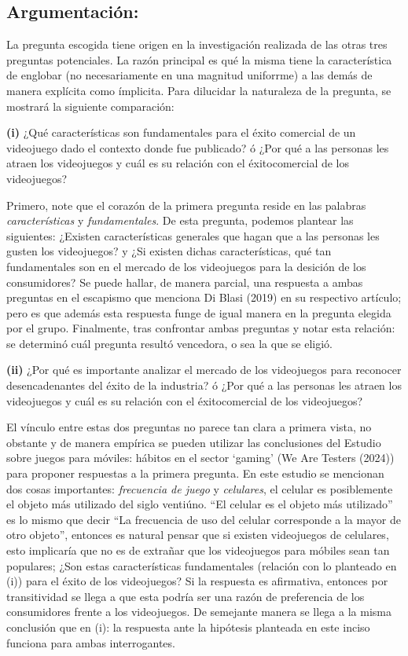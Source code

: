 \documentclass[
  letterpaper,
  DIV=11,
  numbers=noendperiod]{scrreprt}
\begin{document}
\hypertarget{argumentaciuxf3n}{%
\subsection{Argumentación:}\label{argumentaciuxf3n}}

La pregunta escogida tiene origen en la investigación realizada de las
otras tres preguntas potenciales. La razón principal es qué la misma
tiene la característica de englobar (no necesariamente en una magnitud
uniforrme) a las demás de manera explícita como ímplicita. Para
dilucidar la naturaleza de la pregunta, se mostrará la siguiente
comparación:

\textbf{(i)} ¿Qué características son fundamentales para el éxito
comercial de un videojuego dado el contexto donde fue publicado? ó ¿Por
qué a las personas les atraen los videojuegos y cuál es su relación con
el éxitocomercial de los videojuegos?

Primero, note que el corazón de la primera pregunta reside en las
palabras \emph{características} y \emph{fundamentales}. De esta
pregunta, podemos plantear las siguientes: ¿Existen características
generales que hagan que a las personas les gusten los videojuegos? y ¿Si
existen dichas características, qué tan fundamentales son en el mercado
de los videojuegos para la desición de los consumidores? Se puede
hallar, de manera parcial, una respuesta a ambas preguntas en el
escapismo que menciona Di Blasi (2019) en su respectivo artículo; pero
es que además esta respuesta funge de igual manera en la pregunta
elegida por el grupo. Finalmente, tras confrontar ambas preguntas y
notar esta relación: se determinó cuál pregunta resultó vencedora, o sea
la que se eligió.

\textbf{(ii)} ¿Por qué es importante analizar el mercado de los
videojuegos para reconocer desencadenantes del éxito de la industria? ó
¿Por qué a las personas les atraen los videojuegos y cuál es su relación
con el éxitocomercial de los videojuegos?

El vínculo entre estas dos preguntas no parece tan clara a primera
vista, no obstante y de manera empírica se pueden utilizar las
conclusiones del Estudio sobre juegos para móviles: hábitos en el sector
`gaming' (We Are Testers (2024)) para proponer respuestas a la primera
pregunta. En este estudio se mencionan dos cosas importantes:
\emph{frecuencia de juego} y \emph{celulares}, el celular es
posiblemente el objeto más utilizado del siglo ventiúno. ``El celular es
el objeto más utilizado'' es lo mismo que decir ``La frecuencia de uso
del celular corresponde a la mayor de otro objeto'', entonces es natural
pensar que si existen videojuegos de celulares, esto implicaría que no
es de extrañar que los videojuegos para móbiles sean tan populares; ¿Son
estas características fundamentales (relación con lo planteado en (i))
para el éxito de los videojuegos? Si la respuesta es afirmativa,
entonces por transitividad se llega a que esta podría ser una razón de
preferencia de los consumidores frente a los videojuegos. De semejante
manera se llega a la misma conclusión que en (i): la respuesta ante la
hipótesis planteada en este inciso funciona para ambas interrogantes.
\end{document}

